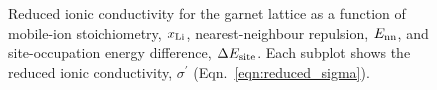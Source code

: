 \documentclass[aps,prb,twocolumn,superscriptaddress,reprint]{revtex4-1}
\newcommand{\xLi}{x_\m{Li}}
\begin{document}
\begin{figure}[tb]
  \centering
    \caption{\label{fig:conductivity_miniplots}Reduced ionic conductivity for the garnet lattice as a function of mobile-ion stoichiometry, $\xLi$, nearest-neighbour repulsion, $E_{\mathrm{nn}}$, and site-occupation energy difference, $\Delta E_{\mathrm{site}}$. Each subplot shows the reduced ionic conductivity, $\sigma^\prime$ (Eqn.~\ref{eqn:reduced_sigma}).}
\end{figure}



\end{document}
